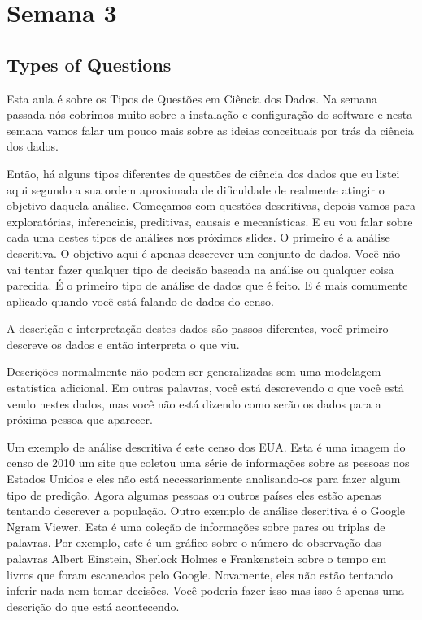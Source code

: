 \section{Semana 3}


\subsection{Types of Questions}

Esta aula é sobre os Tipos de Questões em Ciência dos Dados. Na semana passada nós cobrimos muito sobre a instalação e configuração do software e nesta semana vamos falar um pouco mais sobre as ideias conceituais por trás da ciência dos dados. 

Então, há alguns tipos diferentes de questões de ciência dos dados que eu listei aqui segundo a sua ordem aproximada de dificuldade de realmente atingir o objetivo daquela análise. Começamos com questões descritivas, depois vamos para exploratórias, inferenciais, preditivas, causais e mecanísticas. E eu vou falar sobre cada uma destes tipos de análises nos próximos slides. O primeiro é a análise descritiva. O objetivo aqui é apenas descrever um conjunto de dados. Você não vai tentar fazer qualquer tipo de decisão baseada na análise ou qualquer coisa parecida. É o primeiro tipo de análise de dados que é feito. E é mais comumente aplicado quando você está falando de dados do censo. 

A descrição e interpretação destes dados são passos diferentes, você primeiro descreve os dados e então interpreta o que viu. 

Descrições normalmente não podem ser generalizadas sem uma modelagem estatística adicional. Em outras palavras, você está descrevendo o que você está vendo nestes dados, mas você não está dizendo como serão os dados para a próxima pessoa que aparecer. 

Um exemplo de análise descritiva é este censo dos EUA. Esta é uma imagem do censo de 2010 um site que coletou uma série de informações sobre as pessoas nos Estados Unidos e eles não está necessariamente analisando-os para fazer algum tipo de predição. Agora algumas pessoas ou outros países eles estão apenas tentando descrever a população. Outro exemplo de análise descritiva é o Google Ngram Viewer. Esta é uma coleção de informações sobre pares ou triplas de palavras. Por exemplo, este é um gráfico sobre o número de observação das palavras Albert Einstein, Sherlock Holmes e Frankenstein sobre o tempo em livros que foram escaneados pelo Google. Novamente, eles não estão tentando inferir nada nem tomar decisões. Você poderia fazer isso mas isso é apenas uma descrição do que está acontecendo. 

